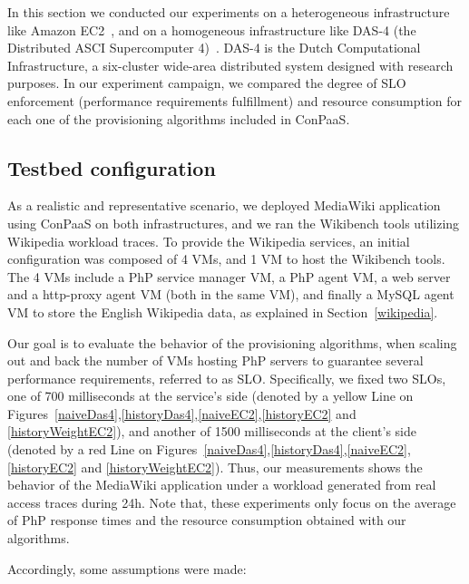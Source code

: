 In this section we conducted our experiments on a heterogeneous infrastructure like Amazon EC2~\cite{amazonEC2}, and on a homogeneous infrastructure like DAS-4 (the Distributed ASCI Supercomputer 4)~\cite{das4}. DAS-4 is the Dutch Computational Infrastructure, a six-cluster wide-area distributed system designed with research purposes. In our experiment campaign, we compared the degree of SLO enforcement (performance requirements fulfillment) and resource consumption for each one of the provisioning algorithms included in ConPaaS. 


\subsection*{Testbed configuration}

As a realistic and representative scenario, we deployed MediaWiki application using ConPaaS on both infrastructures, and we ran the Wikibench tools utilizing Wikipedia workload traces.  To provide the Wikipedia services, an initial configuration was composed of 4 VMs, and 1 VM to host the Wikibench tools. The 4 VMs include a PhP service manager VM, a PhP agent VM, a web server and a http-proxy agent VM (both in the same VM), and finally a MySQL agent VM to store the English Wikipedia data, as explained in Section~\ref{wikipedia}.

Our goal is to evaluate the behavior of the provisioning algorithms, when scaling out and back the number of VMs hosting PhP servers to guarantee several performance requirements, referred to as SLO. Specifically, we fixed two SLOs, one of 700 milliseconds at the service's side (denoted by a yellow Line on Figures~\ref{naiveDas4},\ref{historyDas4},\ref{naiveEC2},\ref{historyEC2} and \ref{historyWeightEC2}), and another of 1500 milliseconds at the client's side (denoted by a red Line on Figures~\ref{naiveDas4},\ref{historyDas4},\ref{naiveEC2},\ref{historyEC2} and \ref{historyWeightEC2}). Thus, our measurements shows the behavior of the MediaWiki application under a workload generated from real access traces during 24h. Note that, these experiments only focus on the average of PhP response times and the resource consumption obtained with our algorithms. 

\vspace{2mm}

\noindent Accordingly, some assumptions were made:

